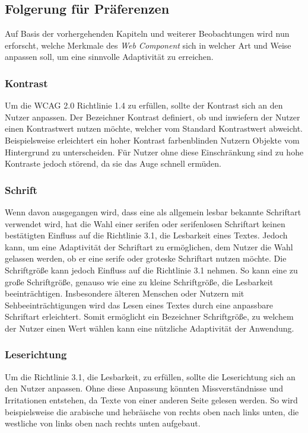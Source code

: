 \documentclass[12pt, paper=a4, bibtotoc, toc=listof, headsepline=true]{scrreprt}
\begin{document}
		\subsection{Folgerung für Präferenzen}
		Auf Basis der vorhergehenden Kapiteln und weiterer Beobachtungen wird nun erforscht, welche Merkmale des \emph{Web Component} sich in welcher Art und Weise anpassen soll, um eine sinnvolle Adaptivität zu erreichen.
			\subsubsection{Kontrast}
			Um die \ac{WCAG 2.0} Richtlinie 1.4 zu erfüllen, sollte der Kontrast sich an den Nutzer anpassen. Der Bezeichner Kontrast definiert, ob und inwiefern der Nutzer einen Kontrastwert nutzen möchte, welcher vom Standard Kontrastwert abweicht. Beispielsweise erleichtert ein hoher Kontrast farbenblinden Nutzern Objekte vom Hintergrund zu unterscheiden. Für Nutzer ohne diese Einschränkung sind zu hohe Kontraste jedoch störend, da sie das Auge schnell ermüden\cite[S.234]{balzert2009webdesign}.
			\subsubsection{Schrift}
			Wenn davon ausgegangen wird, dass eine als allgemein lesbar bekannte Schriftart verwendet wird, hat die Wahl einer serifen oder serifenlosen Schriftart keinen bestätigten Einfluss auf die Richtlinie 3.1, die Lesbarkeit eines Textes\cite[S.157-161]{barrierefreiheit}. Jedoch kann, um eine Adaptivität der Schriftart zu ermöglichen, dem Nutzer die Wahl gelassen werden, ob er eine serife oder groteske Schriftart nutzen möchte.
			Die Schriftgröße kann jedoch Einfluss auf die Richtlinie 3.1 nehmen. So kann eine zu große Schriftgröße, genauso wie eine zu kleine Schriftgröße, die Lesbarkeit beeinträchtigen. Insbesondere älteren Menschen oder Nutzern mit Sehbeeinträchtigungen wird das Lesen eines Textes durch eine anpassbare Schriftart erleichtert\cite[S.152]{barrierefreiheit}. Somit ermöglicht ein Bezeichner Schriftgröße, zu welchem der Nutzer einen Wert wählen kann eine nützliche Adaptivität der Anwendung. 
			\subsubsection{Leserichtung}
			\label{ref:lesRic}
			Um die Richtlinie 3.1, die Lesbarkeit, zu erfüllen, sollte die Leserichtung sich an den Nutzer anpassen. Ohne diese Anpassung könnten Missverständnisse und Irritationen entstehen, da Texte von einer anderen Seite gelesen werden. So wird beispielsweise die arabische und hebräische von rechts oben nach links unten, die westliche von links oben nach rechts unten aufgebaut\cite[S.148]{emrich2013interkulturelles}.
\end{document}

